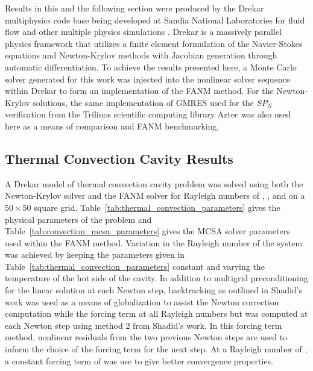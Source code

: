 Results in this and the following section were produced by the Drekar
multiphysics code base being developed at Sandia National Laboratories
for fluid flow and other multiple physics simulations
\cite{pawlowski_drekar_2012}. Drekar is a massively parallel physics
framework that utilizes a finite element formulation of the
Navier-Stokes equations and Newton-Krylov methods with Jacobian
generation through automatic differentiation. To achieve the results
presented here, a Monte Carlo solver generated for this work was
injected into the nonlinear solver sequence within Drekar to form an
implementation of the FANM method. For the Newton-Krylov solutions,
the same implementation of GMRES used for the $SP_N$ verification from
the Trilinos scientific computing library Aztec
\cite{heroux_overview_2005} was also used here as a means of
comparison and FANM benchmarking.

\subsection{Thermal Convection Cavity Results}
\label{subsec:thermal_convection_verification}

A Drekar model of thermal convection cavity problem was solved using
both the Newton-Krylov solver and the FANM solver for Rayleigh numbers
of , ,  and  on a $50 \times 50$
square grid. Table~\ref{tab:thermal_convection_parameters} gives the
physical parameters of the problem and
Table~\ref{tab:convection_mcsa_parameters} gives the MCSA solver
parameters used within the FANM method. Variation in the Rayleigh
number of the system was achieved by keeping the parameters given in
Table~\ref{tab:thermal_convection_parameters} constant and varying the
temperature of the hot side of the cavity. In addition to multigrid
preconditioning for the linear solution at each Newton step,
backtracking as outlined in Shadid's work \cite{shadid_inexact_1997}
was used as a means of globalization to assist the Newton correction
computation while the forcing term at all Rayleigh numbers but
 was computed at each Newton step using method 2 from
Shadid's work. In this forcing term method, nonlinear residuals from
the two previous Newton steps are used to inform the choice of the
forcing term for the next step. At a Rayleigh number of , a
constant forcing term of  was use to give better convergence
properties.

